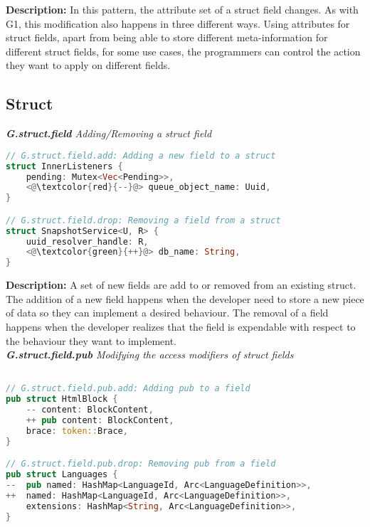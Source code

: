 \noindent \textbf{Description:} In this pattern, the attribute set of a struct field changes. As with G1, this modification also happens in three different ways. Using attributes for struct fields, apart from being able to store different meta-information for different struct fields, for some use cases, the programmers can control the action they want to apply on different fields.

\subsection{Struct} 
\noindent \textit{ \textbf{G.struct.field} Adding/Removing a struct field}

\begin{lstlisting}[language=Rust, style=colouredRust, label={l3}]
// G.struct.field.add: Adding a new field to a struct
struct InnerListeners {
    pending: Mutex<Vec<Pending>>,
    <@\textcolor{red}{--}@> queue_object_name: Uuid,
}

// G.struct.field.drop: Removing a field from a struct
struct SnapshotService<U, R> {
    uuid_resolver_handle: R,
    <@\textcolor{green}{++}@> db_name: String,
}
\end{lstlisting}

\noindent \textbf{Description:} A set of new fields are add to or removed from an existing struct. The addition of a new field happens when the developer need to store a new piece of data so they can implement a desired behaviour. The removal of a field  happens when the developer realizes that the field is expendable with respect to the behaviour they want to implement. \\

\noindent \textit{ \textbf{G.struct.field.pub} Modifying the access modifiers of struct fields}

\begin{lstlisting}[language=Rust, style=colouredRust, label={l3}]

// G.struct.field.pub.add: Adding pub to a field
pub struct HtmlBlock {
    -- content: BlockContent,
    ++ pub content: BlockContent,
    brace: token::Brace,
} 

// G.struct.field.pub.drop: Removing pub from a field
pub struct Languages {
--  pub named: HashMap<LanguageId, Arc<LanguageDefinition>>,
++  named: HashMap<LanguageId, Arc<LanguageDefinition>>,
    extensions: HashMap<String, Arc<LanguageDefinition>>,
}

\end{lstlisting}

